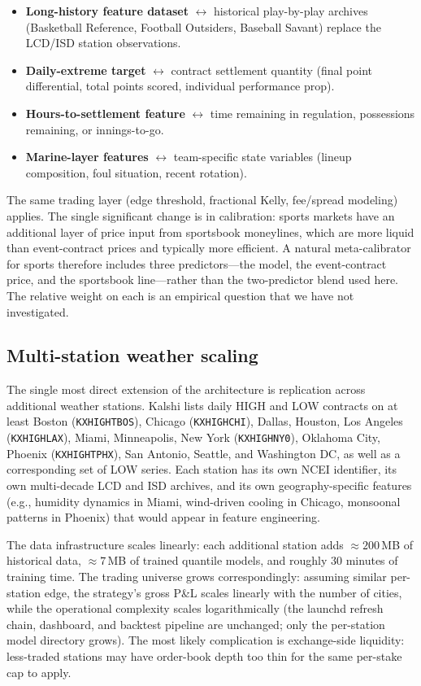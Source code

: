 \documentclass[11pt]{article}
\begin{document}
\begin{itemize}[leftmargin=*,topsep=2pt,itemsep=2pt]
\item \textbf{Long-history feature dataset} $\leftrightarrow$ historical
play-by-play archives (Basketball Reference, Football Outsiders, Baseball
Savant) replace the LCD/ISD station observations.
\item \textbf{Daily-extreme target} $\leftrightarrow$ contract settlement
quantity (final point differential, total points scored, individual
performance prop).
\item \textbf{Hours-to-settlement feature} $\leftrightarrow$ time
remaining in regulation, possessions remaining, or innings-to-go.
\item \textbf{Marine-layer features} $\leftrightarrow$ team-specific
state variables (lineup composition, foul situation, recent rotation).
\end{itemize}

The same trading layer (edge threshold, fractional Kelly, fee/spread
modeling) applies. The single significant change is in calibration:
sports markets have an additional layer of price input from sportsbook
moneylines, which are more liquid than event-contract prices and
typically more efficient. A natural meta-calibrator for sports therefore
includes three predictors---the model, the event-contract price, and the
sportsbook line---rather than the two-predictor blend used here. The
relative weight on each is an empirical question that we have not
investigated.

\subsection{Multi-station weather scaling}

The single most direct extension of the architecture is replication
across additional weather stations. Kalshi lists daily HIGH and LOW
contracts on at least Boston (\texttt{KXHIGHTBOS}), Chicago
(\texttt{KXHIGHCHI}), Dallas, Houston, Los Angeles (\texttt{KXHIGHLAX}),
Miami, Minneapolis, New York (\texttt{KXHIGHNY0}), Oklahoma City, Phoenix
(\texttt{KXHIGHTPHX}), San Antonio, Seattle, and Washington DC, as well
as a corresponding set of LOW series. Each station has its own NCEI
identifier, its own multi-decade LCD and ISD archives, and its own
geography-specific features (e.g., humidity dynamics in Miami,
wind-driven cooling in Chicago, monsoonal patterns in Phoenix) that would
appear in feature engineering.

The data infrastructure scales linearly: each additional station adds
$\approx 200$\,MB of historical data, $\approx 7$\,MB of trained
quantile models, and roughly $30$ minutes of training time. The trading
universe grows correspondingly: assuming similar per-station edge, the
strategy's gross P\&L scales linearly with the number of cities, while
the operational complexity scales logarithmically (the launchd refresh
chain, dashboard, and backtest pipeline are unchanged; only the per-station
model directory grows). The most likely complication is exchange-side
liquidity: less-traded stations may have order-book depth too thin for
the same per-stake cap to apply.
\end{document}
